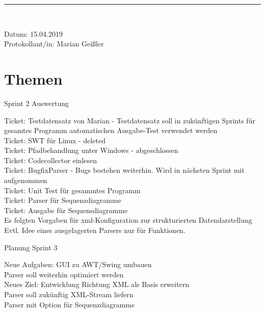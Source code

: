 \begin{center}
\vspace{0.5pt}\nointerlineskip\rule{\textwidth}{0.2pt}\\ 
\vspace{0.5pt}\nointerlineskip
\end{center} 
\large Datum: 15.04.2019\vspace{3pt}\\\large Protokollant/in: Marian Geißler
\section{Themen}
\begin{LARGE}
Sprint 2 Auswertung\\
\end{LARGE}
Ticket: Testdatensatz von Marian - Testdatensatz soll in zukünftigen Sprints für gesamtes Programm automatischen Ausgabe-Test verwendet werden\\
Ticket: SWT für Linux - deleted\\
Ticket: Pfadbehandlung unter Windows - abgeschlossen\\
Ticket: Codecollector einlesen  \\
Ticket: BugfixParser - Bugs bestehen weiterhin. Wird in nächsten Sprint mit aufgenommen\\
Ticket: Unit Test für gesammtes Programm\\
Ticket: Parser für Sequenzdiagramme\\
Ticket: Ausgabe für Sequensdiagramme\\
Es folgten Vorgaben für xml-Konfiguration zur strukturierten Datendarstellung\\
Evtl. Idee eines ausgelagerten Parsers nur für Funktionen.\\
\begin{LARGE} 
Planung Sprint 3\\
\end{LARGE}
Neue Aufgaben: GUI zu AWT/Swing umbauen\\
Parser soll weiterhin optimiert werden\\
Neues Ziel: Entwicklung Richtung XML als Basis erweitern\\
Parser soll zukünftig XML-Stream liefern\\
Parser mit Option für Sequenzdiagramme\\
